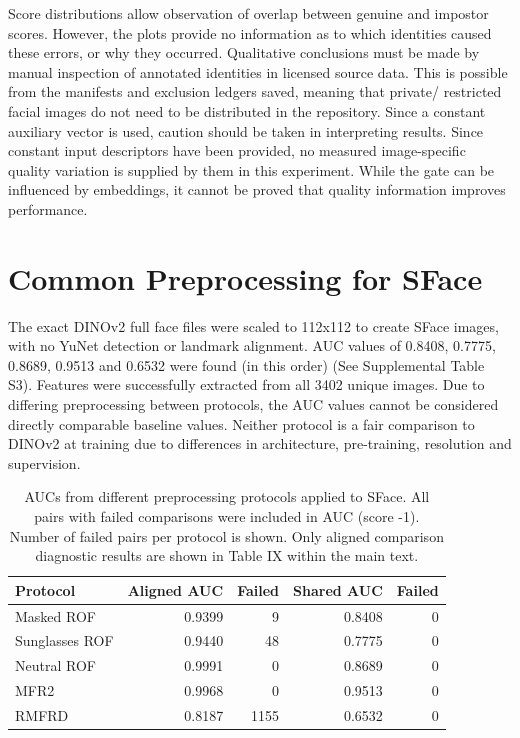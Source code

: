 Score distributions allow observation of overlap between genuine and impostor scores. However, the plots provide no information as to which identities caused these errors, or why they occurred. Qualitative conclusions must be made by manual inspection of annotated identities in licensed source data. This is possible from the manifests and exclusion ledgers saved, meaning that private/ restricted facial images do not need to be distributed in the repository. Since a constant auxiliary vector is used, caution should be taken in interpreting results. Since constant input descriptors have been provided, no measured image-specific quality variation is supplied by them in this experiment. While the gate can be influenced by embeddings, it cannot be proved that quality information improves performance.\par

\section{Common Preprocessing for SFace}

The exact DINOv2 full face files were scaled to 112x112 to create SFace images, with no YuNet detection or landmark alignment. AUC values of 0.8408, 0.7775, 0.8689, 0.9513 and 0.6532 were found (in this order) (See Supplemental Table S3). Features were successfully extracted from all 3402 unique images. Due to differing preprocessing between protocols, the AUC values cannot be considered directly comparable baseline values. Neither protocol is a fair comparison to DINOv2 at training due to differences in architecture, pre-training, resolution and supervision.\par

\begin{table}[!ht]\centering\footnotesize\setlength{\tabcolsep}{2pt}
\caption{AUCs from different preprocessing protocols applied to SFace. All pairs with failed comparisons were included in AUC (score -1). Number of failed pairs per protocol is shown. Only aligned comparison diagnostic results are shown in Table IX within the main text.}
\label{tab:sfaceshared}\begin{tabular}{lrrrr}\toprule
Protocol & Aligned AUC & Failed & Shared AUC & Failed\\\midrule
Masked ROF & 0.9399 & 9 & 0.8408 & 0\\
Sunglasses ROF & 0.9440 & 48 & 0.7775 & 0\\
Neutral ROF & 0.9991 & 0 & 0.8689 & 0\\
MFR2 & 0.9968 & 0 & 0.9513 & 0\\
RMFRD & 0.8187 & 1155 & 0.6532 & 0\\
\bottomrule\end{tabular}\end{table}

